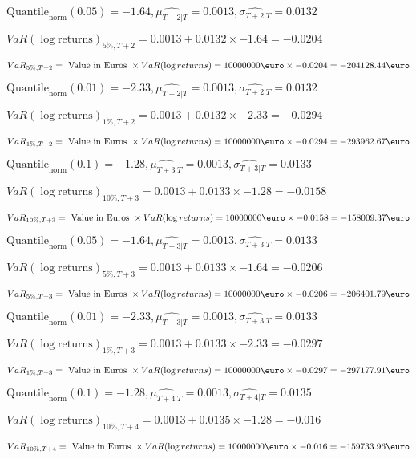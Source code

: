 $\text{Quantile}_\text{norm}(0.05) = -1.64,\hat{\mu_{T+2|T}} = 0.0013, \hat{\sigma_{T+2|T}} = 0.0132$

$VaR(\log \text{returns})_{5\%, T + 2} = 0.0013 + 0.0132\times-1.64 = -0.0204$

$VaR_{5\%, T + 2} = \text{ Value in Euros } \times VaR(\log returns) = 10 000 000 \text{\euro} \times-0.0204 = -204128.44 \text{\euro}$


$\text{Quantile}_\text{norm}(0.01) = -2.33,\hat{\mu_{T+2|T}} = 0.0013, \hat{\sigma_{T+2|T}} = 0.0132$

$VaR(\log \text{returns})_{1\%, T + 2} = 0.0013 + 0.0132\times-2.33 = -0.0294$

$VaR_{1\%, T + 2} = \text{ Value in Euros } \times VaR(\log returns) = 10 000 000 \text{\euro} \times-0.0294 = -293962.67 \text{\euro}$


$\text{Quantile}_\text{norm}(0.1) = -1.28,\hat{\mu_{T+3|T}} = 0.0013, \hat{\sigma_{T+3|T}} = 0.0133$

$VaR(\log \text{returns})_{10\%, T + 3} = 0.0013 + 0.0133\times-1.28 = -0.0158$

$VaR_{10\%, T + 3} = \text{ Value in Euros } \times VaR(\log returns) = 10 000 000 \text{\euro} \times-0.0158 = -158009.37 \text{\euro}$


$\text{Quantile}_\text{norm}(0.05) = -1.64,\hat{\mu_{T+3|T}} = 0.0013, \hat{\sigma_{T+3|T}} = 0.0133$

$VaR(\log \text{returns})_{5\%, T + 3} = 0.0013 + 0.0133\times-1.64 = -0.0206$

$VaR_{5\%, T + 3} = \text{ Value in Euros } \times VaR(\log returns) = 10 000 000 \text{\euro} \times-0.0206 = -206401.79 \text{\euro}$


$\text{Quantile}_\text{norm}(0.01) = -2.33,\hat{\mu_{T+3|T}} = 0.0013, \hat{\sigma_{T+3|T}} = 0.0133$

$VaR(\log \text{returns})_{1\%, T + 3} = 0.0013 + 0.0133\times-2.33 = -0.0297$

$VaR_{1\%, T + 3} = \text{ Value in Euros } \times VaR(\log returns) = 10 000 000 \text{\euro} \times-0.0297 = -297177.91 \text{\euro}$


$\text{Quantile}_\text{norm}(0.1) = -1.28,\hat{\mu_{T+4|T}} = 0.0013, \hat{\sigma_{T+4|T}} = 0.0135$

$VaR(\log \text{returns})_{10\%, T + 4} = 0.0013 + 0.0135\times-1.28 = -0.016$

$VaR_{10\%, T + 4} = \text{ Value in Euros } \times VaR(\log returns) = 10 000 000 \text{\euro} \times-0.016 = -159733.96 \text{\euro}$


